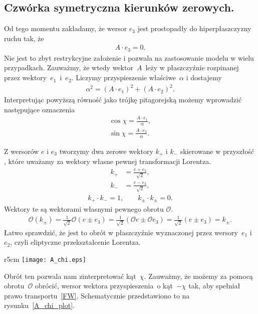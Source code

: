 \subsection{Czwórka symetryczna kierunków zerowych.}
Od tego momentu zakładamy, że wersor $e_3$ jest prostopadły do 
hiperpłaszczyzny ruchu tak, że
\begin{align*}
A\cdot e_3 = 0.
\end{align*}
Nie jest to zbyt restrykcyjne założenie i pozwala 
na zastosowanie modelu w wielu przypadkach.
Zauważmy, że wtedy wektor~$A$~leży w płaszczyźnie rozpinanej przez 
wektory~$e_1$~i~$e_2$. Liczymy przyspieszenie właściwe~$\alpha$ i 
dostajemy
\begin{align*}
\alpha^2 = (A\cdot e_1)^2 + (A\cdot e_2)^2.
\end{align*}
Interpretując powyższą równość jako trójkę pitagorejską 
możemy wprowadzić następujące oznaczenia
\begin{align*}
\cos\chi = \frac{A\cdot e_1}{\alpha},\\
\sin\chi = \frac{A\cdot e_2}{\alpha}.
\end{align*}

Z wersorów $e$ i $e_3$ tworzymy dwa zerowe wektory $k_+$ i $k_-$
skierowane w przyszłość , 
które uważamy za wektory własne pewnej transformacji Lorentza. 
\begin{align}
k_+ &= \frac{e+e_3}{\sqrt{2}} ,\\
k_- &= \frac{e-e_3}{\sqrt{2}} ,
\end{align}
\begin{align*}
k_+\cdot k_- = 1, \qquad k_\pm\cdot k_\pm  = 0.
\end{align*}
Wektory te są wektorami własnymi pewnego obrotu $\mathcal{O}$.
\begin{align*}
\mathcal{O}( k_\pm ) = \frac{1}{\sqrt{2}} \mathcal{O} 
(e\pm e_3) =\frac{1}{\sqrt{2}} 
(\mathcal{O} e\pm \mathcal{O} e_3) =
\frac{1}{\sqrt{2}}  (e\pm e_3) = k_\pm.
\end{align*}
 Łatwo sprawdzić, że 
jest 
to obrót w płaszczyźnie wyznaczonej przez wersory~$e_1$ i $e_2$,
czyli eliptyczne przekształcenie Lorentza. 
\begin{wrapfigure}[15]{r}{5cm}
\centering
\texttt{[image: A\_chi.eps]}
\caption{Schemat obrazujący obrót~$\mathcal{O}$ wykonany na wersorze 
przyspieszenia $A/\alpha$ w bazie $E$.}{\label{A_chi_plot}}
\end{wrapfigure}
Obrót ten pozwala nam zinterpretować kąt~$\chi$. 
Zauważmy, że możemy za pomocą obrotu~$\mathcal{O}$ obrócić, 
wersor wektora przyspieszenia~o kąt~$-\chi$ 
tak, aby spełniał prawo transportu~\eqref{FW}. 
Schematycznie przedstawiono to na rysunku~\ref{A_chi_plot}.

